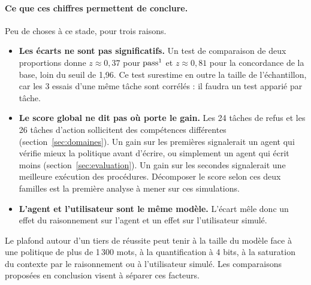 \paragraph{Ce que ces chiffres permettent de conclure.} Peu de choses à ce stade, pour trois raisons.
\begin{itemize}[nosep]
  \item \textbf{Les écarts ne sont pas significatifs.} Un test de comparaison de deux proportions donne $z \approx 0{,}37$ pour $\text{pass}^{1}$ et $z \approx 0{,}81$ pour la concordance de la base, loin du seuil de 1,96. Ce test surestime en outre la taille de l'échantillon, car les 3 essais d'une même tâche sont corrélés : il faudra un test apparié par tâche.
  \item \textbf{Le score global ne dit pas où porte le gain.} Les 24 tâches de refus et les 26 tâches d'action sollicitent des compétences différentes (section~\ref{sec:domaines}). Un gain sur les premières signalerait un agent qui vérifie mieux la politique avant d'écrire, ou simplement un agent qui écrit moins (section~\ref{sec:evaluation}). Un gain sur les secondes signalerait une meilleure exécution des procédures. Décomposer le score selon ces deux familles est la première analyse à mener sur ces simulations.
  \item \textbf{L'agent et l'utilisateur sont le même modèle.} L'écart mêle donc un effet du raisonnement sur l'agent et un effet sur l'utilisateur simulé.
\end{itemize}
Le plafond autour d'un tiers de réussite peut tenir à la taille du modèle face à une politique de plus de 1\,300 mots, à la quantification à 4 bits, à la saturation du contexte par le raisonnement ou à l'utilisateur simulé. Les comparaisons proposées en conclusion visent à séparer ces facteurs.
